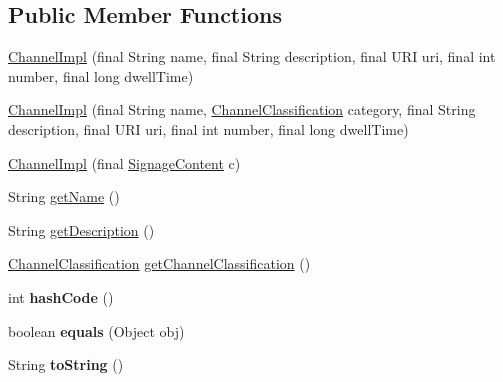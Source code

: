 \subsection*{Public Member Functions}
\begin{DoxyCompactItemize}
\item 
\hyperlink{classgov_1_1fnal_1_1ppd_1_1dd_1_1channel_1_1ChannelImpl_a0136bf00463f15803ac336ede9dd22ef}{Channel\-Impl} (final String name, final String description, final U\-R\-I uri, final int number, final long dwell\-Time)
\item 
\hyperlink{classgov_1_1fnal_1_1ppd_1_1dd_1_1channel_1_1ChannelImpl_a3841b129f361c795ca8f05bd33b14ae8}{Channel\-Impl} (final String name, \hyperlink{classgov_1_1fnal_1_1ppd_1_1dd_1_1changer_1_1ChannelClassification}{Channel\-Classification} category, final String description, final U\-R\-I uri, final int number, final long dwell\-Time)
\item 
\hyperlink{classgov_1_1fnal_1_1ppd_1_1dd_1_1channel_1_1ChannelImpl_aa613d61797497d882a495bc8cb361294}{Channel\-Impl} (final \hyperlink{interfacegov_1_1fnal_1_1ppd_1_1dd_1_1signage_1_1SignageContent}{Signage\-Content} c)
\item 
String \hyperlink{classgov_1_1fnal_1_1ppd_1_1dd_1_1channel_1_1ChannelImpl_afdf0ebebdeb8dce27f58bb59da71dc7d}{get\-Name} ()
\item 
String \hyperlink{classgov_1_1fnal_1_1ppd_1_1dd_1_1channel_1_1ChannelImpl_aa990515286ca3d8245b15b3f50989714}{get\-Description} ()
\item 
\hyperlink{classgov_1_1fnal_1_1ppd_1_1dd_1_1changer_1_1ChannelClassification}{Channel\-Classification} \hyperlink{classgov_1_1fnal_1_1ppd_1_1dd_1_1channel_1_1ChannelImpl_abf99f1bbe72901a00d1d39228f02cff1}{get\-Channel\-Classification} ()
\item 
\hypertarget{classgov_1_1fnal_1_1ppd_1_1dd_1_1channel_1_1ChannelImpl_aab7741e5c01a8e946c8bf6e9618d0476}{int {\bfseries hash\-Code} ()}\label{classgov_1_1fnal_1_1ppd_1_1dd_1_1channel_1_1ChannelImpl_aab7741e5c01a8e946c8bf6e9618d0476}

\item 
\hypertarget{classgov_1_1fnal_1_1ppd_1_1dd_1_1channel_1_1ChannelImpl_af275bb3e62de9af3316698cd7c2074be}{boolean {\bfseries equals} (Object obj)}\label{classgov_1_1fnal_1_1ppd_1_1dd_1_1channel_1_1ChannelImpl_af275bb3e62de9af3316698cd7c2074be}

\item 
\hypertarget{classgov_1_1fnal_1_1ppd_1_1dd_1_1channel_1_1ChannelImpl_a4af4ac34390c96d255e9483dfa5ad5d6}{String {\bfseries to\-String} ()}\label{classgov_1_1fnal_1_1ppd_1_1dd_1_1channel_1_1ChannelImpl_a4af4ac34390c96d255e9483dfa5ad5d6}


\end{DoxyCompactItemize}
